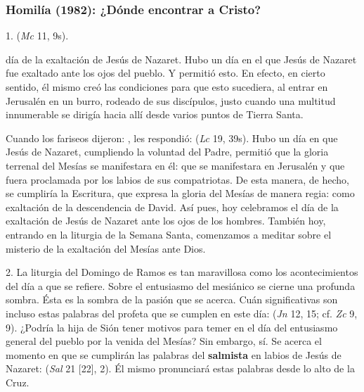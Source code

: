 \newpage

\subsubsection{Homilía (1982): ¿Dónde encontrar a Cristo?}


\begin{body}
1.  (\textit{Mc} 11, 9s).

 día de la exaltación de Jesús de Nazaret. Hubo un día en el que Jesús de Nazaret fue exaltado ante los ojos del pueblo. Y permitió esto. En efecto, en cierto sentido, él mismo creó las condiciones para que esto sucediera, al entrar en Jerusalén en un burro, rodeado de sus discípulos, justo cuando una multitud innumerable se dirigía hacia allí desde varios puntos de Tierra Santa.

Cuando los fariseos dijeron: , les respondió:  (\textit{Lc} 19, 39s). Hubo un día en que Jesús de Nazaret, cumpliendo la voluntad del Padre, permitió que la gloria terrenal del Mesías se manifestara en él: que se manifestara en Jerusalén y que fuera proclamada por los labios de sus compatriotas. De esta manera, de hecho, se cumpliría la Escritura, que expresa la gloria del Mesías de manera regia: como exaltación de la descendencia de David. Así pues, hoy celebramos el día de la exaltación de Jesús de Nazaret ante los ojos de los hombres. También hoy, entrando en la liturgia de la Semana Santa, comenzamos a meditar sobre el misterio de la exaltación del Mesías ante Dios.

2. La liturgia del Domingo de Ramos es tan maravillosa como los acontecimientos del día a que se refiere. Sobre el entusiasmo del mesiánico  se cierne una profunda sombra. Ésta es la sombra de la pasión que se acerca. Cuán significativas son incluso estas palabras del profeta que se cumplen en este día:  (\textit{Jn} 12, 15; cf. \textit{Zc} 9, 9). ¿Podría la hija de Sión tener motivos para temer en el día del entusiasmo general del pueblo por la venida del Mesías? Sin embargo, sí. Se acerca el momento en que se cumplirán las palabras del \textbf{salmista} en labios de Jesús de Nazaret:  (\textit{Sal} 21 [22], 2). Él mismo pronunciará estas palabras desde lo alto de la Cruz.


\end{body}
